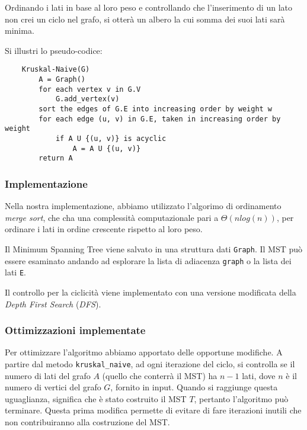Ordinando i lati in base al loro peso e controllando che l'inserimento
di un lato non crei un ciclo nel grafo, si otterà un albero la cui
somma dei suoi lati sarà minima.

Si illustri lo pseudo-codice:
\begin{verbatim}
    Kruskal-Naive(G)
        A = Graph()
        for each vertex v in G.V
            G.add_vertex(v)
        sort the edges of G.E into increasing order by weight w
        for each edge (u, v) in G.E, taken in increasing order by weight
            if A U {(u, v)} is acyclic
                A = A U {(u, v)}
        return A
\end{verbatim}

\subsubsection{Implementazione}

Nella nostra implementazione, abbiamo utilizzato l'algorimo di
ordinamento \textit{merge sort}, che cha una complessità
computazionale pari a $\Theta(n log(n))$, per ordinare i lati
in ordine crescente rispetto al loro peso.

Il Minimum Spanning Tree viene salvato in una struttura dati
\verb|Graph|. Il MST può essere esaminato andando ad
esplorare la lista di adiacenza \verb|graph| o la lista dei
lati \verb|E|.

Il controllo per la ciclicità viene implementato con una
versione modificata della \textit{Depth First Search}
(\textit{DFS}).

\subsubsection{Ottimizzazioni implementate}

Per ottimizzare l'algoritmo abbiamo apportato delle opportune
modifiche. A partire dal metodo \verb|kruskal_naive|, ad
ogni iterazione del ciclo, si controlla se il numero di lati
del grafo $A$ (quello che conterrà il MST) ha $n - 1$ lati,
dove $n$ è il numero di vertici del grafo $G$, fornito in input.
Quando si raggiunge questa uguaglianza, significa che è stato
costruito il MST $T$, pertanto l'algoritmo può terminare.
Questa prima modifica permette di evitare di fare iterazioni
inutili che non contribuiranno alla costruzione del MST.

